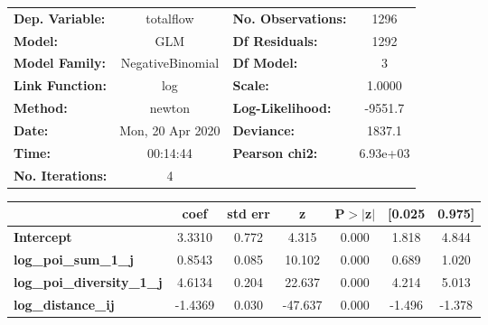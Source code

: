 \begin{center}
\begin{tabular}{lclc}
\toprule
\textbf{Dep. Variable:}            &    totalflow     & \textbf{  No. Observations:  } &     1296    \\
\textbf{Model:}                    &       GLM        & \textbf{  Df Residuals:      } &     1292    \\
\textbf{Model Family:}             & NegativeBinomial & \textbf{  Df Model:          } &        3    \\
\textbf{Link Function:}            &       log        & \textbf{  Scale:             } &    1.0000   \\
\textbf{Method:}                   &      newton      & \textbf{  Log-Likelihood:    } &   -9551.7   \\
\textbf{Date:}                     & Mon, 20 Apr 2020 & \textbf{  Deviance:          } &    1837.1   \\
\textbf{Time:}                     &     00:14:44     & \textbf{  Pearson chi2:      } &  6.93e+03   \\
\textbf{No. Iterations:}           &        4         & \textbf{                     } &             \\
\bottomrule
\end{tabular}
\begin{tabular}{lcccccc}
                                   & \textbf{coef} & \textbf{std err} & \textbf{z} & \textbf{P$> |$z$|$} & \textbf{[0.025} & \textbf{0.975]}  \\
\midrule
\textbf{Intercept}                 &       3.3310  &        0.772     &     4.315  &         0.000        &        1.818    &        4.844     \\
\textbf{log\_poi\_sum\_1\_j}       &       0.8543  &        0.085     &    10.102  &         0.000        &        0.689    &        1.020     \\
\textbf{log\_poi\_diversity\_1\_j} &       4.6134  &        0.204     &    22.637  &         0.000        &        4.214    &        5.013     \\
\textbf{log\_distance\_ij}         &      -1.4369  &        0.030     &   -47.637  &         0.000        &       -1.496    &       -1.378     \\
\bottomrule
\end{tabular}
\end{center}